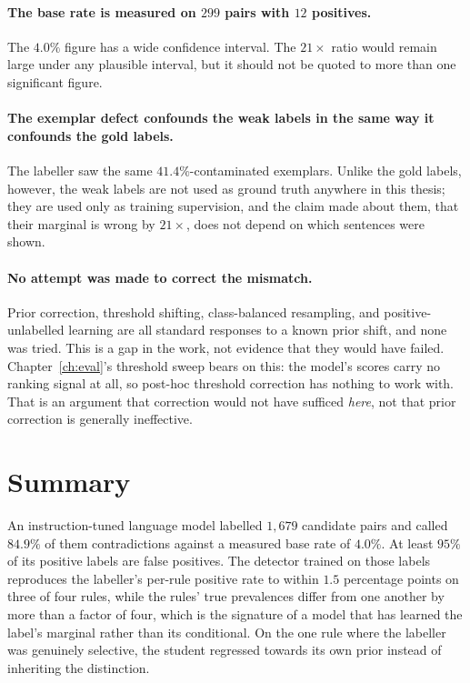 \paragraph{The base rate is measured on $299$ pairs with $12$ positives.} The
$4.0\%$ figure has a wide confidence interval. The $21\times$ ratio would remain
large under any plausible interval, but it should not be quoted to more than one
significant figure.

\paragraph{The exemplar defect confounds the weak labels in the same way it
confounds the gold labels.} The labeller saw the same $41.4\%$-contaminated
exemplars. Unlike the gold labels, however, the weak labels are not used as
ground truth anywhere in this thesis; they are used only as training
supervision, and the claim made about them, that their marginal is wrong by
$21\times$, does not depend on which sentences were shown.

\paragraph{No attempt was made to correct the mismatch.} Prior correction,
threshold shifting, class-balanced resampling, and positive-unlabelled learning
are all standard responses to a known prior shift, and none was tried. This is a
gap in the work, not evidence that they would have failed.
Chapter~\ref{ch:eval}'s threshold sweep bears on this: the model's scores carry
no ranking signal at all, so post-hoc threshold correction has nothing to work
with. That is an argument that correction would not have sufficed \emph{here},
not that prior correction is generally ineffective.

\section{Summary}
\label{sec:weak-summary}

An instruction-tuned language model labelled $1{,}679$ candidate pairs and
called $84.9\%$ of them contradictions against a measured base rate of $4.0\%$.
At least $95\%$ of its positive labels are false positives. The detector trained
on those labels reproduces the labeller's per-rule positive rate to within
$1.5$ percentage points on three of four rules, while the rules' true
prevalences differ from one another by more than a factor of four, which is the
signature of a model that has learned the label's marginal rather than its
conditional. On the one rule where the labeller was genuinely selective, the
student regressed towards its own prior instead of inheriting the distinction.

